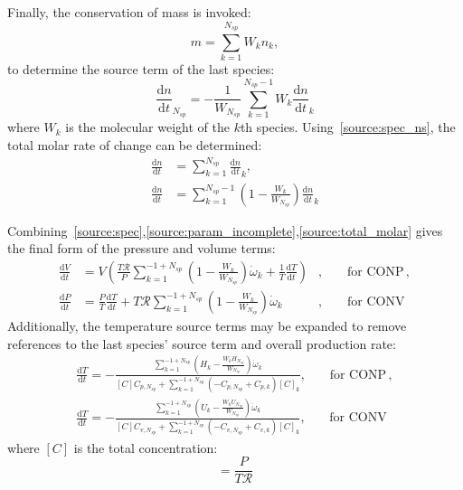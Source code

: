 \documentclass[12pt]{article}
\newcommand{\ns}{\ensuremath{{N_{sp}}}}
\newcommand{\conp}{CONP}
\newcommand{\conv}{CONV}
\newcommand{\dconp}{\ensuremath{,\qquad\text{for \conp}}}
\newcommand{\dconv}{\ensuremath{,\qquad\text{for \conv}}}
\newcommand{\Ru}{\ensuremath{\mathcal{R}}}
\begin{document}
Finally, the conservation of mass is invoked:
\begin{equation*}
 m = \sum_{k=1}^{\ns} W_{k} n_{k},
\end{equation*}
to determine the source term of the last species:
\begin{equation}
 \frac{\text{d} n }{\text{d} t }_{\ns} = - \frac{1}{W_{\ns}} \sum_{k=1}^{\ns - 1} W_{k} \frac{\text{d} n }{\text{d} t }_{k}
 \label{source:spec_ns}
\end{equation}
where $W_{k}$ is the molecular weight of the $k$th species.
Using~\eqref{source:spec_ns}, the total molar rate of change can be determined:
\begin{align}
\frac{\text{d} n }{\text{d} t } &= \sum_{k=1}^{\ns} \frac{\text{d} n }{\text{d} t }_{k}, \nonumber \\
\frac{\text{d} n }{\text{d} t } &= \sum_{k=1}^{\ns - 1} \left(1 - \frac{W_{k}}{W_{\ns}}\right) \frac{\text{d} n }{\text{d} t }_{k}
\label{source:total_molar}
\end{align}

Combining~\eqref{source:spec},\eqref{source:param_incomplete},\eqref{source:total_molar} gives the final form of the pressure and volume terms:
\begin{subequations}
\label{source:param_complete}
\begin{align}
\frac{\text{d} V }{\text{d} t } &= V \left(\frac{T \Ru}{P} \sum_{k=1}^{-1 + \ns} \left(1 - \frac{W_{k}}{W_{\ns}}\right) \dot{\omega}_{k} + \frac{1}{T} \frac{\text{d} T }{\text{d} t }\right)&\dconp, \\
\frac{\text{d} P }{\text{d} t } &= \frac{P}{T} \frac{\text{d} T }{\text{d} t } + T \Ru \sum_{k=1}^{-1 + \ns} \left(1 - \frac{W_{k}}{W_{\ns}}\right) \dot{\omega}_{k}&\dconv
\end{align}
\end{subequations}
Additionally, the temperature source terms may be expanded to remove references to the last species' source term and overall production rate:
\begin{subequations}
\label{source:temperature_complete}
\begin{align}
\frac{\text{d} T }{\text{d} t } = - \frac{\sum_{k=1}^{-1 + \ns} \left(H_{k} - \frac{W_{k} H_{\ns}}{W_{\ns}}\right) \dot{\omega}_{k}}{[C] {C_{p,\ns}} + \sum_{k=1}^{-1 + \ns} \left(- {C_{p,\ns}} + {C_{p, k}}\right) [C]_{k}}\dconp,\\
\frac{\text{d} T }{\text{d} t } = - \frac{\sum_{k=1}^{-1 + \ns} \left(U_{k} - \frac{W_{k} U_{\ns}}{W_{\ns}}\right) \dot{\omega}_{k}}{[C] {C_{v,\ns}} + \sum_{k=1}^{-1 + \ns} \left(- {C_{v,\ns}} + {C_{v, k}}\right) [C]_{k}}\dconv
\end{align}
\end{subequations}
where $[C]$ is the total concentration:
\begin{equation}
 [C] = \frac{P}{T \Ru}
\end{equation}



\printbibliography 
\end{document}
